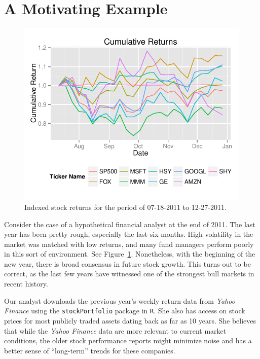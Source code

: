\documentclass[a4paper]{article}\usepackage[]{graphicx}\usepackage[]{color}
\makeatletter
\def\maxwidth{ %
  \ifdim\Gin@nat@width>\linewidth
    \linewidth
  \else
    \Gin@nat@width
  \fi
}
\newenvironment{knitrout}{}{} %
\makeatother
\begin{document}
\section{A Motivating Example}

\begin{figure}[H]
    \centering
\begin{knitrout}
\color{fgcolor}
\includegraphics[width=\maxwidth]{figure/sixmonth-1} 

\end{knitrout}
    \caption{Indexed stock returns for the period of 07-18-2011 to 12-27-2011.}
    \label{fig:sixmonth}
\end{figure}

Consider the case of a hypothetical financial analyst at the end of 2011. The last year has been pretty rough, especially the last six months. High volatility in the market was matched with low returns, and many fund managers perform poorly in this sort of environment. See Figure~\ref{fig:sixmonth}. Nonetheless, with the beginning of the new year, there is broad consensus in future stock growth. This turns out to be correct, as the last few years have witnessed one of the strongest bull markets in recent history.

Our analyst downloads the previous year's weekly return data from \textit{Yahoo Finance} using the \texttt{stockPortfolio} package in \texttt{R}. She also has access on stock prices for most publicly traded assets dating back as far as 10 years. She believes that while the \textit{Yahoo Finance} data are more relevant to current market conditions, the older stock performance reports might minimize noise and has a better sense of ``long-term'' trends for these companies.
\end{document}
